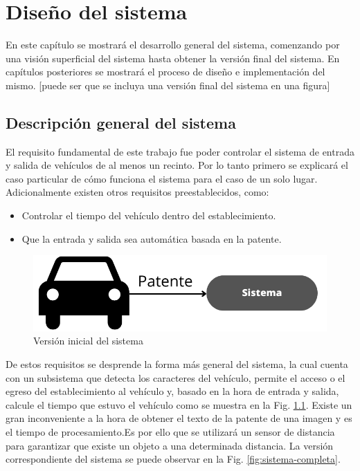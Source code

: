 \chapter{Diseño del sistema}

En este capítulo se mostrará el desarrollo general del sistema, comenzando por una visión superficial del sistema hasta obtener la versión final del sistema. En capítulos posteriores se mostrará el proceso de diseño e implementación del mismo. [puede ser que se incluya una versión final del sistema en una figura]

\section{Descripción general del sistema}

El requisito fundamental de este trabajo fue poder controlar el sistema de entrada y salida de vehículos de al menos un recinto. Por lo tanto primero se explicará el caso particular de cómo funciona el sistema para el caso de un solo lugar. Adicionalmente existen otros requisitos preestablecidos, como:

\begin{itemize}
    \item Controlar el tiempo del vehículo dentro del establecimiento.
    \item Que la entrada y salida sea automática basada en la patente.
\end{itemize}

\begin{figure}
    \centering
    \includegraphics[width=.8\textwidth]{imgs/sistema-base.png}
    \caption{Versión inicial del sistema}
    \label{fig:sistema-base}
\end{figure}

De estos requisitos se desprende la forma más general del sistema, la cual cuenta con un subsistema que detecta los caracteres del vehículo, permite el acceso o el egreso del establecimiento al vehículo y, basado en la hora de entrada y salida, calcule el tiempo que estuvo el vehículo como se muestra en la Fig. \ref{fig:sistema-base}.
Existe un gran inconveniente a la hora de obtener el texto de la patente de una imagen y es el tiempo de procesamiento.Es por ello que se utilizará un sensor de distancia para garantizar que existe un objeto a una determinada distancia.
La versión correspondiente del sistema se puede observar en la Fig. \ref{fig:sistema-completa}.

